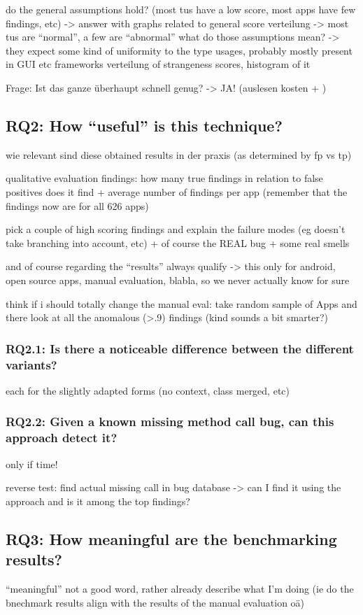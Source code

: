 do the general assumptions hold? (most tus have a low score, most apps have few findings, etc)
    -> answer with graphs related to general score verteilung
    -> most tus are ``normal'', a few are ``abnormal''
    what do those assumptions mean? -> they expect some kind of uniformity to the type usages, probably mostly present in GUI etc frameworks
verteilung of strangeness scores, histogram of it

Frage: Ist das ganze überhaupt schnell genug?
-> JA!
(auslesen kosten + )

\subsection{RQ2: How ``useful'' is this technique?}
wie relevant sind diese obtained results in der praxis (as determined by fp vs tp)

qualitative evaluation findings:
how many true findings in relation to false positives does it find + average number of findings per app (remember that the findings now are for all 626 apps)

pick a couple of high scoring findings and explain the failure modes (eg doesn't take branching into account, etc)
+ of course the REAL bug + some real smells

and of course regarding the ``results'' always qualify -> this only for android, open source apps, manual evaluation, blabla, so we never actually know for sure

think if i should totally change the manual eval: take random sample of Apps and there look at all the anomalous (>.9) findings (kind sounds a bit smarter?)

\subsubsection{RQ2.1: Is there a noticeable difference between the different variants?}
each for the slightly adapted forms (no context, class merged, etc)

\subsubsection{RQ2.2: Given a known missing method call bug, can this approach detect it?}
only if time!

reverse test: find actual missing call in bug database -> can I find it using the approach and is it among the top findings?

\subsection{RQ3: How meaningful are the benchmarking results?}
``meaningful'' not a good word, rather already describe what I'm doing (ie do the bnechmark results align with the results of the manual evaluation oä)

